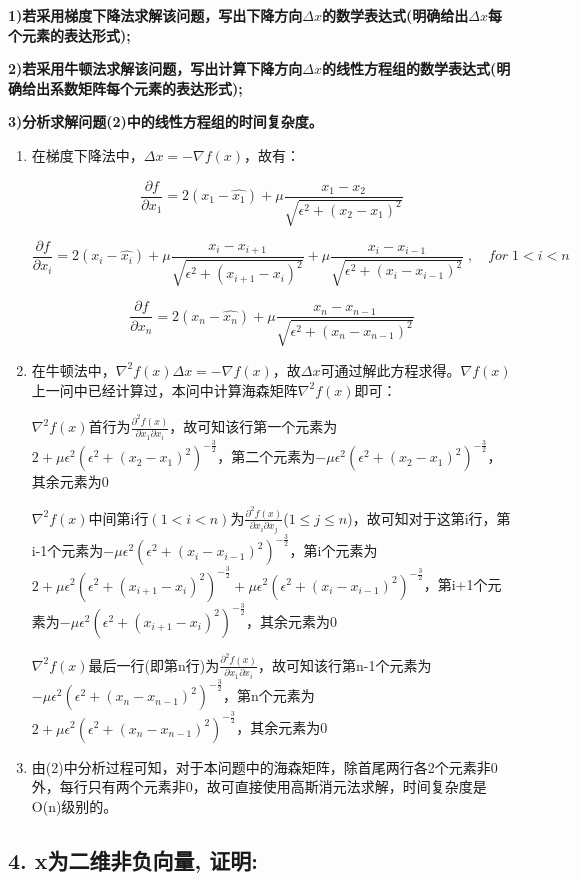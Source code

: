 \documentclass[]{article}
\begin{document}
\textbf{1)若采用梯度下降法求解该问题，写出下降方向$\Delta x$的数学表达式(明确给出$\Delta x$每个元素的表达形式);}

\textbf{2)若采用牛顿法求解该问题，写出计算下降方向$\Delta x$的线性方程组的数学表达式(明确给出系数矩阵每个元素的表达形式);}

\textbf{3)分析求解问题(2)中的线性方程组的时间复杂度。}

\begin{enumerate}[(1)]
\item
    在梯度下降法中，$\Delta x=-\nabla f(x)$，故有：
    
    $$
    \frac{\partial f}{\partial x_1}=2(x_1-\hat{x_1})+\mu \frac{x_1-x_{2}}{\sqrt{\epsilon^2+(x_{2}-x_1)^2}}
    $$
    
    $$
    \frac{\partial f}{\partial x_i}=2(x_i-\hat{x_i})+\mu \frac{x_i-x_{i+1}}{\sqrt{\epsilon^2+(x_{i+1}-x_i)^2}}+\mu \frac{x_i-x_{i-1}}{\sqrt{\epsilon^2+(x_{i}-x_{i-1})^2}}\;,\quad for\;1<i<n
    $$
    
    $$
    \frac{\partial f}{\partial x_n}=2(x_n-\hat{x_n})+\mu \frac{x_n-x_{n-1}}{\sqrt{\epsilon^2+(x_{n}-x_{n-1})^2}}
    $$

\item
    在牛顿法中，$\nabla^2 f(x) \Delta x=-\nabla f(x)$，故$\Delta x$可通过解此方程求得。$\nabla f(x)$上一问中已经计算过，本问中计算海森矩阵$\nabla^2 f(x)$即可：
    
    $\nabla^2 f(x)$首行为$\frac{\partial^2 f(x)}{\partial x_1 \partial x_i}$，故可知该行第一个元素为$2+\mu \epsilon^2(\epsilon^2+(x_2-x_1)^2)^{-\frac{3}{2}}$，第二个元素为$-\mu \epsilon^2(\epsilon^2+(x_2-x_1)^2)^{-\frac{3}{2}}$，其余元素为0
    
    $\nabla^2 f(x)$中间第i行$(1<i<n)$为$\frac{\partial^2 f(x)}{\partial x_i \partial x_j}$($1\leq j \leq n$)，故可知对于这第i行，第i-1个元素为$-\mu \epsilon^2(\epsilon^2+(x_i-x_{i-1})^2)^{-\frac{3}{2}}$，第i个元素为$2+\mu \epsilon^2(\epsilon^2+(x_{i+1}-x_{i})^2)^{-\frac{3}{2}}+\mu \epsilon^2(\epsilon^2+(x_i-x_{i-1})^2)^{-\frac{3}{2}}$，第i+1个元素为$-\mu \epsilon^2(\epsilon^2+(x_{i+1}-x_{i})^2)^{-\frac{3}{2}}$，其余元素为0
    
    $\nabla^2 f(x)$最后一行(即第n行)为$\frac{\partial^2 f(x)}{\partial x_1 \partial x_i}$，故可知该行第n-1个元素为$-\mu \epsilon^2(\epsilon^2+(x_{n}-x_{n-1})^2)^{-\frac{3}{2}}$，第n个元素为$2+\mu \epsilon^2(\epsilon^2+(x_{n}-x_{n-1})^2)^{-\frac{3}{2}}$，其余元素为0

\item
    由(2)中分析过程可知，对于本问题中的海森矩阵，除首尾两行各2个元素非0外，每行只有两个元素非0，故可直接使用高斯消元法求解，时间复杂度是O(n)级别的。

\end{enumerate}
\hypertarget{header-n102}{%
\subsection{4. x为二维非负向量, 证明:}\label{header-n102}}
\end{document}
